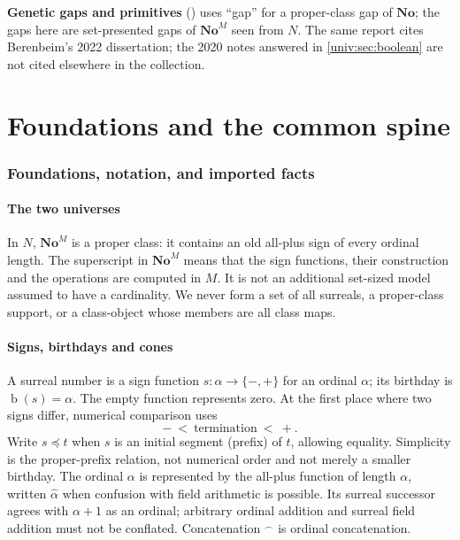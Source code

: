 \documentclass[11pt,letterpaper]{article}
\numberwithin{equation}{section}
\theoremstyle{definition}
\theoremstyle{remark}
\newcommand{\No}{\mathbf{No}}
\newcommand{\NoM}{\No^{M}}
\newcommand{\bd}{\operatorname{b}}
\newcommand{\cat}{\mathbin{{}^{\frown}}}
\newcommand{\hatord}[1]{\widehat{#1}}
\begin{document}
\textbf{Genetic gaps and primitives}
() uses ``gap'' for a
proper-class gap of $\No$; the gaps here are set-presented gaps of $\NoM$ seen
from $N$. The same report cites Berenbeim's 2022 dissertation; the 2020 notes
answered in \cref{univ:sec:boolean} are not cited elsewhere in the collection.

\part{Foundations and the common spine}\label{univ:part:spine}

\section{Foundations, notation, and imported facts}\label{univ:sec:foundations}

\subsection{The two universes}

In $N$, $\NoM$ is a proper class: it contains an old all-plus sign of every
ordinal length. The superscript in $\NoM$ means that the sign functions, their
construction and the operations are computed in $M$. It is not an additional
set-sized model assumed to have a cardinality. We never form a set of all
surreals, a proper-class support, or a class-object whose members are all
class maps.

\subsection{Signs, birthdays and cones}

A surreal number is a sign function $s:\alpha\to\{-,+\}$ for an ordinal
$\alpha$; its birthday is $\bd(s)=\alpha$. The empty function represents zero.
At the first place where two signs differ, numerical comparison uses
\[
 -\ <\ \text{termination}\ <\ +.
\]
Write $s\preceq t$ when $s$ is an initial segment (prefix) of $t$, allowing
equality. Simplicity is the proper-prefix relation, not numerical order and not
merely a smaller birthday. The ordinal $\alpha$ is represented by the all-plus
function of length $\alpha$, written $\hatord\alpha$ when confusion with field
arithmetic is possible. Its surreal successor agrees with $\alpha+1$ as an
ordinal; arbitrary ordinal addition and surreal field addition must not be
conflated. Concatenation $\cat$ is ordinal concatenation.
\end{document}
